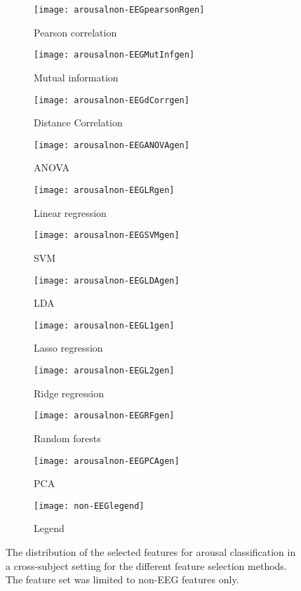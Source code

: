 \begin{figure}[!tbp]
  \centering
  \begin{subfigure}[b]{0.3\textwidth}
    \texttt{[image: arousalnon-EEGpearsonRgen]}
    \caption{Pearson correlation}
  \end{subfigure}
  \hfill
  \begin{subfigure}[b]{0.3\textwidth}
    \texttt{[image: arousalnon-EEGMutInfgen]}
    \caption{Mutual information}
  \end{subfigure}
  \hfill
  \begin{subfigure}[b]{0.3\textwidth}
    \texttt{[image: arousalnon-EEGdCorrgen]}
    \caption{Distance Correlation}
  \end{subfigure}
  
  \begin{subfigure}[b]{0.3\textwidth}
    \texttt{[image: arousalnon-EEGANOVAgen]}
    \caption{ANOVA}
  \end{subfigure}
  \hfill
  \begin{subfigure}[b]{0.3\textwidth}
    \texttt{[image: arousalnon-EEGLRgen]}
    \caption{Linear regression}
  \end{subfigure}
  \hfill
  \begin{subfigure}[b]{0.3\textwidth}
    \texttt{[image: arousalnon-EEGSVMgen]}
    \caption{SVM}
  \end{subfigure}
  
  \begin{subfigure}[b]{0.3\textwidth}
    \texttt{[image: arousalnon-EEGLDAgen]}
    \caption{LDA}
  \end{subfigure}
  \hfill
  \begin{subfigure}[b]{0.3\textwidth}
    \texttt{[image: arousalnon-EEGL1gen]}
    \caption{Lasso regression}
  \end{subfigure}
  \hfill
  \begin{subfigure}[b]{0.3\textwidth}
    \texttt{[image: arousalnon-EEGL2gen]}
    \caption{Ridge regression}
  \end{subfigure}
  
  \begin{subfigure}[b]{0.3\textwidth}
    \texttt{[image: arousalnon-EEGRFgen]}
    \caption{Random forests}
  \end{subfigure}
  \hfill
  \begin{subfigure}[b]{0.3\textwidth}
    \texttt{[image: arousalnon-EEGPCAgen]}
    \caption{PCA}
  \end{subfigure}
  \hfill
  \begin{subfigure}[b]{0.3\textwidth}
    \texttt{[image: non-EEGlegend]}
    \caption{Legend\label{arousalpiesnon-EEGlegendgen}}
  \end{subfigure}
\caption{The distribution of the selected features for arousal classification in a cross-subject setting for the different feature selection methods. The feature set was limited to non-EEG features only. \label{arousalnon-EEGpiesgen}}
\end{figure}

